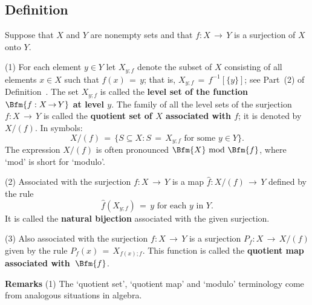 {\V

        \subsection{\small{{\bf Definition}}}
        \label{DefA50.60}

\V

        Suppose that $X$ and $Y$ are nonempty sets and that $f:X\,{\rightarrow}\,Y$ is a surjection of $X$ onto $Y$.

\V

        (1) For each element $y{\in}Y$ let $X_{y;f}$ denote the subset of $X$ consisting of all elements $x{\in}X$ such that $f(x) \,=\, y$;
    that is, $X_{y;f} \,=\, f^{-1}[\{y\}]$; see Part~(2) of Definition~.
    The set $X_{y;f}$ is called the {\bf level set of the function $\Bfm{f:X \,{\rightarrow}\, Y}$ at level $y$}.
    The family of all the level sets of the surjection $f:X \,{\rightarrow}\, Y$ is called the {\bf quotient set of $X$ associated with $f$};
     it is denoted by $X/(f)$.
    In symbols:
        \begin{displaymath}
        X/(f) \,=\, \{S{\subseteq}X: S \,=\, X_{y;f} \mbox{ for some $y{\in}Y$}\}.
        \end{displaymath}
    The expression $X/(f)$ is often pronounced {\bf $\Bfm{X}\mbox{ mod } \Bfm{f}$}, where `mod' is short for `modulo'.

\V

        (2) Associated with the surjection $f:X \,{\rightarrow}\, Y$ is a map $\hat{f}:X/(f) \,{\rightarrow}\, Y$ defined by the rule
        \begin{displaymath}
        \hat{f}(X_{y;f}) \,=\, y \mbox{ for each $y$ in $Y$}.
        \end{displaymath}
    It is called the {\bf natural bijection}
     associated with the given surjection.

\V

        (3) Also associated with the surjection $f:X \,{\rightarrow}\, Y$ is a surjection
    $P_{f}:X \,{\rightarrow}\, X/(f)$ given by the rule $P_{f}(x) \,=\, X_{f(x); f}$.
    This function is called the {\bf quotient map associated with~$\Bfm{f}$}.

\VV

        {\bf Remarks} (1) The `quotient set', `quotient map' and `modulo' terminology come from analogous situations in algebra.

}
